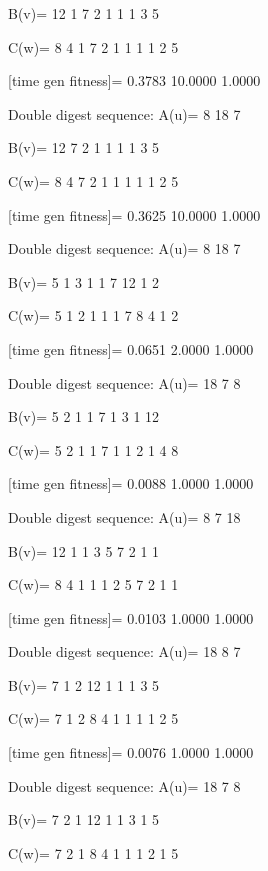 B(v)=
    12     1     7     2     1     1     1     3     5

C(w)=
     8     4     1     7     2     1     1     1     1     2     5

[time gen fitness]=
    0.3783   10.0000    1.0000

Double digest sequence:
A(u)=
     8    18     7

B(v)=
    12     7     2     1     1     1     1     3     5

C(w)=
     8     4     7     2     1     1     1     1     1     2     5

[time gen fitness]=
    0.3625   10.0000    1.0000

Double digest sequence:
A(u)=
     8    18     7

B(v)=
     5     1     3     1     1     7    12     1     2

C(w)=
     5     1     2     1     1     1     7     8     4     1     2

[time gen fitness]=
    0.0651    2.0000    1.0000

Double digest sequence:
A(u)=
    18     7     8

B(v)=
     5     2     1     1     7     1     3     1    12

C(w)=
     5     2     1     1     7     1     1     2     1     4     8

[time gen fitness]=
    0.0088    1.0000    1.0000

Double digest sequence:
A(u)=
     8     7    18

B(v)=
    12     1     1     3     5     7     2     1     1

C(w)=
     8     4     1     1     1     2     5     7     2     1     1

[time gen fitness]=
    0.0103    1.0000    1.0000

Double digest sequence:
A(u)=
    18     8     7

B(v)=
     7     1     2    12     1     1     1     3     5

C(w)=
     7     1     2     8     4     1     1     1     1     2     5

[time gen fitness]=
    0.0076    1.0000    1.0000

Double digest sequence:
A(u)=
    18     7     8

B(v)=
     7     2     1    12     1     1     3     1     5

C(w)=
     7     2     1     8     4     1     1     1     2     1     5

